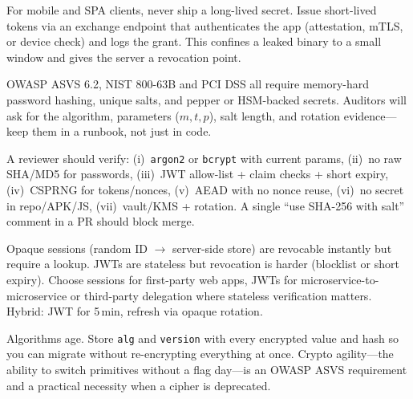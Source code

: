 For mobile and SPA clients, never ship a long-lived secret. Issue short-lived tokens via an exchange endpoint that authenticates the app (attestation, mTLS, or device check) and logs the grant. This confines a leaked binary to a small window and gives the server a revocation point.

\begin{remark}
OWASP ASVS 6.2, NIST 800-63B and PCI DSS all require memory-hard password hashing, unique salts, and pepper or HSM-backed secrets. Auditors will ask for the algorithm, parameters ($m,t,p$), salt length, and rotation evidence---keep them in a runbook, not just in code.
\end{remark}

\begin{example}
A reviewer should verify: (i)~\texttt{argon2} or \texttt{bcrypt} with current params, (ii)~no raw SHA/MD5 for passwords, (iii)~JWT allow-list + claim checks + short expiry, (iv)~CSPRNG for tokens/nonces, (v)~AEAD with no nonce reuse, (vi)~no secret in repo/APK/JS, (vii)~vault/KMS + rotation. A single ``use SHA-256 with salt'' comment in a PR should block merge.
\end{example}

\begin{remark}
Opaque sessions (random ID $\to$ server-side store) are revocable instantly but require a lookup. JWTs are stateless but revocation is harder (blocklist or short expiry). Choose sessions for first-party web apps, JWTs for microservice-to-microservice or third-party delegation where stateless verification matters. Hybrid: JWT for 5\,min, refresh via opaque rotation.
\end{remark}

\begin{remark}
Algorithms age. Store \texttt{alg} and \texttt{version} with every encrypted value and hash so you can migrate without re-encrypting everything at once. Crypto agility---the ability to switch primitives without a flag day---is an OWASP ASVS requirement and a practical necessity when a cipher is deprecated.
\end{remark}

